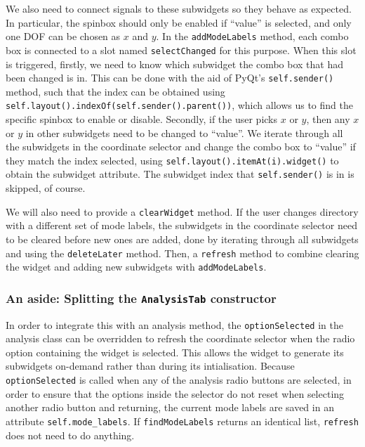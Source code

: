 \documentclass[12pt]{article}
\begin{document}
We also need to connect signals to these subwidgets so they behave as expected. In particular, the spinbox should only be enabled if ``value'' is selected, and only one DOF can be chosen as \(x\) and \(y\). In the \texttt{addModeLabels} method, each combo box is connected to a slot named \texttt{selectChanged} for this purpose. When this slot is triggered, firstly, we need to know which subwidget the combo box that had been changed is in. This can be done with the aid of PyQt's \texttt{self.sender()} method, such that the index can be obtained using \texttt{self.layout().indexOf(self.sender().parent())}, which allows us to find the specific spinbox to enable or disable. Secondly, if the user picks \(x\) or \(y\), then any \(x\) or \(y\) in other subwidgets need to be changed to ``value''. We iterate through all the subwidgets in the coordinate selector and change the combo box to ``value'' if they match the index selected, using \texttt{self.layout().itemAt(i).widget()} to obtain the subwidget attribute. The subwidget index that \texttt{self.sender()} is in is skipped, of course.

We will also need to provide a \texttt{clearWidget} method. If the user changes directory with a different set of mode labels, the subwidgets in the coordinate selector need to be cleared before new ones are added, done by iterating through all subwidgets and using the \texttt{deleteLater} method. Then, a \texttt{refresh} method to combine clearing the widget and adding new subwidgets with \texttt{addModeLabels}.

\subsubsection{An aside: Splitting the \texttt{AnalysisTab} constructor}

In order to integrate this with an analysis method, the \texttt{optionSelected} in the analysis class can be overridden to refresh the coordinate selector when the radio option containing the widget is selected. This allows the widget to generate its subwidgets on-demand rather than during its intialisation. Because \texttt{optionSelected} is called when any of the analysis radio buttons are selected, in order to ensure that the options inside the selector do not reset when selecting another radio button and returning, the current mode labels are saved in an attribute \texttt{self.mode_labels}. If \texttt{findModeLabels} returns an identical list, \texttt{refresh} does not need to do anything.
\end{document}
